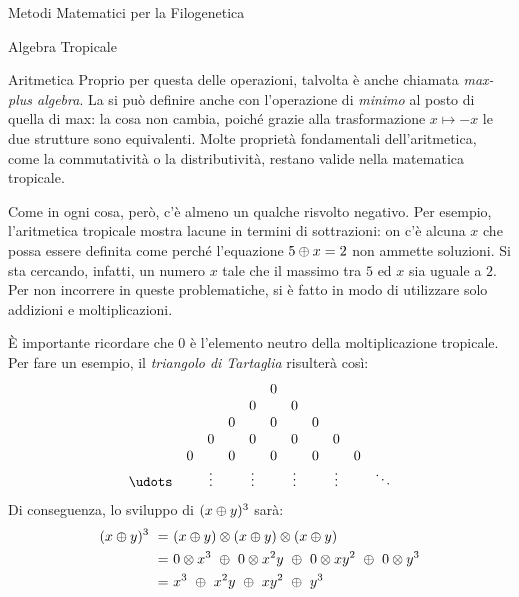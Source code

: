 \documentclass{article}
\begin{document}
\begin{section}{Metodi Matematici per la Filogenetica}
\begin{subsection}{Algebra Tropicale}
\begin{subsubsection}{Aritmetica}
			Proprio per questa  delle operazioni, talvolta è anche chiamata \emph{max-plus algebra}. La si può definire anche con l'operazione di \emph{minimo} al posto di quella di max: la cosa non cambia, poiché grazie alla trasformazione $x \mapsto -x$ le due strutture sono equivalenti.
			Molte proprietà fondamentali dell’aritmetica, come la commutatività o la distributività, restano valide nella matematica tropicale.
			
			Come in ogni cosa, però, c'è almeno un qualche risvolto negativo. Per esempio, l’aritmetica tropicale mostra lacune in termini di sottrazioni: on c’è alcuna $x$ che possa essere definita come  perché l’equazione $5\oplus x = 2$ non ammette soluzioni. Si sta cercando, infatti, un numero $x$ tale che il massimo tra $5$ ed $x$ sia uguale a $2$.
			Per non incorrere in queste problematiche, si è fatto in modo di utilizzare solo addizioni e moltiplicazioni.
			
			È importante ricordare che $0$ è l’elemento neutro della moltiplicazione tropicale. Per fare un esempio, il \emph{triangolo di Tartaglia} risulterà così:
			\begin{align*}
				\begin{array}{ccccccccccc}					
					\phantom 0 & \phantom 0 & \phantom 0 & \phantom 0 & \phantom 0 & 0 & \phantom 0 & \phantom 0 & \phantom 0 & \phantom 0 & \phantom 0 \\ 
					\phantom 0 & \phantom 0 & \phantom 0 & \phantom 0 & 0 & \phantom 0 & 0 & \phantom 0 & \phantom 0 & \phantom 0 & \phantom 0 \\ 
					\phantom 0 & \phantom 0 & \phantom 0 & 0 & \phantom 0 & 0 & \phantom 0 & 0 & \phantom 0 & \phantom 0 & \phantom 0 \\ 
					\phantom 0 & \phantom 0 & 0 & \phantom 0 & 0 & \phantom 0 & 0 & \phantom 0 & 0 & \phantom 0 & \phantom 0 \\
					\phantom 0 & 0 & \phantom 0 & 0 & \phantom 0 & 0 & \phantom 0 & 0 & \phantom 0 & 0 & \phantom 0 \\
					\udots & \phantom 0 & \vdots & \phantom 0 & \vdots &  \phantom 0 &\vdots & \phantom 0 & \vdots & \phantom 0 & \ddots \\
				\end{array}
			\end{align*}	
			Di conseguenza, lo sviluppo di $(x\oplus y)^3$ sarà:
			\begin{align*}
				(x\ts y)^3 \ =& \ (x\ts y)\tp  (x\ts y)\tp  (x\ts y) \\
				=& \ 0\tp x^3 \ \ts \ 0\tp x^2y \ \ts \ 0\tp xy^2 \ \ts \ 0\tp y^3 \\
				=& \ x^3 \ \ts \ x^2y \ \ts \ xy^2 \ \ts \ y^3
			\end{align*}
			

\end{subsubsection}
\end{subsection}
\end{section}
\end{document}
